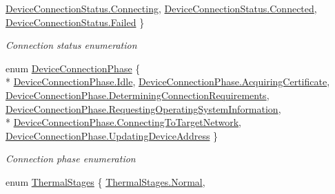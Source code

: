 \begin{DoxyCompactItemize}
\hyperlink{namespace_microsoft_1_1_tools_1_1_windows_device_portal_acbff0faba4b2b8843a2ca4e6333a9407ae321c53b354930ba96f0243e652df458}{Device\+Connection\+Status.\+Connecting}, 
\hyperlink{namespace_microsoft_1_1_tools_1_1_windows_device_portal_acbff0faba4b2b8843a2ca4e6333a9407a2ec0d16e4ca169baedb9b2d50ec5c6d7}{Device\+Connection\+Status.\+Connected}, 
\hyperlink{namespace_microsoft_1_1_tools_1_1_windows_device_portal_acbff0faba4b2b8843a2ca4e6333a9407ad7c8c85bf79bbe1b7188497c32c3b0ca}{Device\+Connection\+Status.\+Failed}
 \}\begin{DoxyCompactList}\small\item\em Connection status enumeration \end{DoxyCompactList}
\item 
enum \hyperlink{namespace_microsoft_1_1_tools_1_1_windows_device_portal_a5d17e74cf37845e22e0498ad89a3bc66}{Device\+Connection\+Phase} \{ \\*
\hyperlink{namespace_microsoft_1_1_tools_1_1_windows_device_portal_a5d17e74cf37845e22e0498ad89a3bc66ae599161956d626eda4cb0a5ffb85271c}{Device\+Connection\+Phase.\+Idle}, 
\hyperlink{namespace_microsoft_1_1_tools_1_1_windows_device_portal_a5d17e74cf37845e22e0498ad89a3bc66a0767933ceb790b9f6f8ef425e0d8159f}{Device\+Connection\+Phase.\+Acquiring\+Certificate}, 
\hyperlink{namespace_microsoft_1_1_tools_1_1_windows_device_portal_a5d17e74cf37845e22e0498ad89a3bc66a70e0c0b9bc4dd415aac276f76ef9c503}{Device\+Connection\+Phase.\+Determining\+Connection\+Requirements}, 
\hyperlink{namespace_microsoft_1_1_tools_1_1_windows_device_portal_a5d17e74cf37845e22e0498ad89a3bc66a950d5e1663bd7ee0232b80db9ca11f6d}{Device\+Connection\+Phase.\+Requesting\+Operating\+System\+Information}, 
\\*
\hyperlink{namespace_microsoft_1_1_tools_1_1_windows_device_portal_a5d17e74cf37845e22e0498ad89a3bc66a378b009c2cd3ad8886223947f809179b}{Device\+Connection\+Phase.\+Connecting\+To\+Target\+Network}, 
\hyperlink{namespace_microsoft_1_1_tools_1_1_windows_device_portal_a5d17e74cf37845e22e0498ad89a3bc66a78dfad4dcd98c36b816f2a8fad96d09a}{Device\+Connection\+Phase.\+Updating\+Device\+Address}
 \}\begin{DoxyCompactList}\small\item\em Connection phase enumeration \end{DoxyCompactList}
\item 
enum \hyperlink{namespace_microsoft_1_1_tools_1_1_windows_device_portal_aba1cf1ca5947296337c5aedd4fa37bf4}{Thermal\+Stages} \{ \hyperlink{namespace_microsoft_1_1_tools_1_1_windows_device_portal_aba1cf1ca5947296337c5aedd4fa37bf4a960b44c579bc2f6818d2daaf9e4c16f0}{Thermal\+Stages.\+Normal}, 

\end{DoxyCompactItemize}
